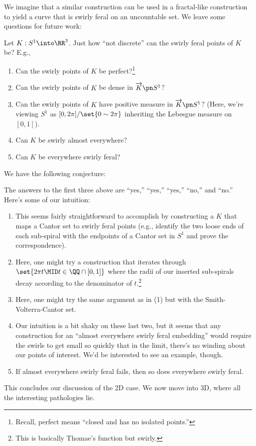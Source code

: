 We imagine that a similar construction can be used in a fractal-like
construction to yield a curve that is swirly feral on an uncountable
set. We leave some questions for future work:
\begin{question}
  Let $K : S^1 \into \RR^3$. Just how ``not discrete'' can the swirly
  feral points of $K$ be? E.g.,
  \begin{enumerate}[label=\arabic*)]
    \item Can the swirly points of $K$ be perfect?\footnote{Recall,
      perfect means ``closed and has no isolated points.''}
    \item Can the swirly points of $K$ be dense in
      $\fim{K}{S^1}$?
    \item Can the swirly points of $K$ have positive measure in
      $\fim{K}{S^1}$? (Here, we're viewing $S^1$ as $[0,2\pi]/\set{0
      \sim 2\pi}$ inheriting the Lebesgue measure on $[0,1]$).
    \item Can $K$ be swirly almost everywhere?
    \item Can $K$ be everywhere swirly feral?\qedhere
  \end{enumerate}
\end{question}
We have the following conjecture:
\begin{conjecture}
  The answers to the first three above are ``yes,'' ``yes,'' ``yes,''
  ``no,'' and ``no.'' Here's some of our intuition:
  \begin{enumerate}[label=\arabic*)]
    \item This seems fairly straightforward to accomplish by
      constructing a $K$ that maps a Cantor set to swirly feral points
      (e.g., identify the two loose ends of each sub-spiral with the
      endpoints of a Cantor set in $S^1$ and prove the
      correspondence).
    \item Here, one might try a construction that iterates through
      $\set{2\pi t \MID t \in \QQ \cap [0,1]}$ where the radii of our
      inserted sub-spirals decay according to the denominator of
      $t$.\footnote{This is basically Thomae's function but swirly.}
    \item Here, one might try the same argument as in (1) but with the
      Smith-Volterra-Cantor set.
    \item Our intuition is a bit shaky on these last two, but it seems
      that any construction for an ``almost everywhere swirly feral
      embedding'' would require the swirls to get small so quickly
      that in the limit, there's no winding about our points of
      interest. We'd be interested to see an example, though.
    \item If almost everywhere swirly feral fails, then so does
      everywhere swirly feral.
  \end{enumerate}
\end{conjecture}
This concludes our discussion of the 2D case. We now move into 3D,
where all the interesting pathologies lie.

